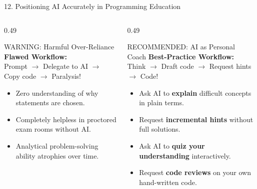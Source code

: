 \documentclass[aspectratio=169, 10pt]{beamer}
\begin{document}
\begin{frame}{12. Positioning AI Accurately in Programming Education}
  \begin{columns}[T]
    \begin{column}{0.49\textwidth}
      \begin{cbox}[accentorange]{WARNING: Harmful Over-Reliance}
        \footnotesize
        \textbf{Flawed Workflow:}\\
        Prompt $\rightarrow$ Delegate to AI $\rightarrow$ Copy code $\rightarrow$ Paralysis!
        \vspace{2pt}
        \begin{itemize}\setlength{\itemsep}{2pt}
          \item Zero understanding of why statements are chosen.
          \item Completely helpless in proctored exam rooms without AI.
          \item Analytical problem-solving ability atrophies over time.
        \end{itemize}
      \end{cbox}
    \end{column}
    \begin{column}{0.49\textwidth}
      \begin{cbox}[secondarygreen]{RECOMMENDED: AI as Personal Coach}
        \footnotesize
        \textbf{Best-Practice Workflow:}\\
        Think $\rightarrow$ Draft code $\rightarrow$ Request hints $\rightarrow$ Code!
        \vspace{2pt}
        \begin{itemize}\setlength{\itemsep}{2pt}
          \item Ask AI to \textbf{explain} difficult concepts in plain terms.
          \item Request \textbf{incremental hints} without full solutions.
          \item Ask AI to \textbf{quiz your understanding} interactively.
          \item Request \textbf{code reviews} on your own hand-written code.
        \end{itemize}
      \end{cbox}
    \end{column}
  \end{columns}
\end{frame}
\end{document}
